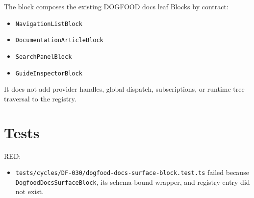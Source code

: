 The block composes the existing DOGFOOD docs leaf Blocks by contract:

\begin{itemize}
\tightlist
\item
  \texttt{N\allowbreak{}a\allowbreak{}v\allowbreak{}i\allowbreak{}g\allowbreak{}a\allowbreak{}t\allowbreak{}i\allowbreak{}o\allowbreak{}n\allowbreak{}L\allowbreak{}i\allowbreak{}s\allowbreak{}t\allowbreak{}B\allowbreak{}l\allowbreak{}o\allowbreak{}c\allowbreak{}k}
\item
  \texttt{D\allowbreak{}o\allowbreak{}c\allowbreak{}u\allowbreak{}m\allowbreak{}e\allowbreak{}n\allowbreak{}t\allowbreak{}a\allowbreak{}t\allowbreak{}i\allowbreak{}o\allowbreak{}n\allowbreak{}A\allowbreak{}r\allowbreak{}t\allowbreak{}i\allowbreak{}c\allowbreak{}l\allowbreak{}e\allowbreak{}B\allowbreak{}l\allowbreak{}o\allowbreak{}c\allowbreak{}k}
\item
  \texttt{S\allowbreak{}e\allowbreak{}a\allowbreak{}r\allowbreak{}c\allowbreak{}h\allowbreak{}P\allowbreak{}a\allowbreak{}n\allowbreak{}e\allowbreak{}l\allowbreak{}B\allowbreak{}l\allowbreak{}o\allowbreak{}c\allowbreak{}k}
\item
  \texttt{G\allowbreak{}u\allowbreak{}i\allowbreak{}d\allowbreak{}e\allowbreak{}I\allowbreak{}n\allowbreak{}s\allowbreak{}p\allowbreak{}e\allowbreak{}c\allowbreak{}t\allowbreak{}o\allowbreak{}r\allowbreak{}B\allowbreak{}l\allowbreak{}o\allowbreak{}c\allowbreak{}k}
\end{itemize}

It does not add provider handles, global dispatch, subscriptions, or runtime tree traversal to the registry.

\section{Tests}\label{record-091-tests}

RED:

\begin{itemize}
\tightlist
\item
  \texttt{t\allowbreak{}e\allowbreak{}s\allowbreak{}t\allowbreak{}s\allowbreak{}/\allowbreak{}c\allowbreak{}y\allowbreak{}c\allowbreak{}l\allowbreak{}e\allowbreak{}s\allowbreak{}/\allowbreak{}D\allowbreak{}F\allowbreak{}-\allowbreak{}0\allowbreak{}3\allowbreak{}0\allowbreak{}/\allowbreak{}d\allowbreak{}o\allowbreak{}g\allowbreak{}f\allowbreak{}o\allowbreak{}o\allowbreak{}d\allowbreak{}-\allowbreak{}d\allowbreak{}o\allowbreak{}c\allowbreak{}s\allowbreak{}-\allowbreak{}s\allowbreak{}u\allowbreak{}r\allowbreak{}f\allowbreak{}a\allowbreak{}c\allowbreak{}e\allowbreak{}-\allowbreak{}b\allowbreak{}l\allowbreak{}o\allowbreak{}c\allowbreak{}k\allowbreak{}.\allowbreak{}t\allowbreak{}e\allowbreak{}s\allowbreak{}t\allowbreak{}.\allowbreak{}t\allowbreak{}s} failed because \texttt{D\allowbreak{}o\allowbreak{}g\allowbreak{}f\allowbreak{}o\allowbreak{}o\allowbreak{}d\allowbreak{}D\allowbreak{}o\allowbreak{}c\allowbreak{}s\allowbreak{}S\allowbreak{}u\allowbreak{}r\allowbreak{}f\allowbreak{}a\allowbreak{}c\allowbreak{}e\allowbreak{}B\allowbreak{}l\allowbreak{}o\allowbreak{}c\allowbreak{}k}, its schema-bound wrapper, and registry entry did not exist.
\end{itemize}

